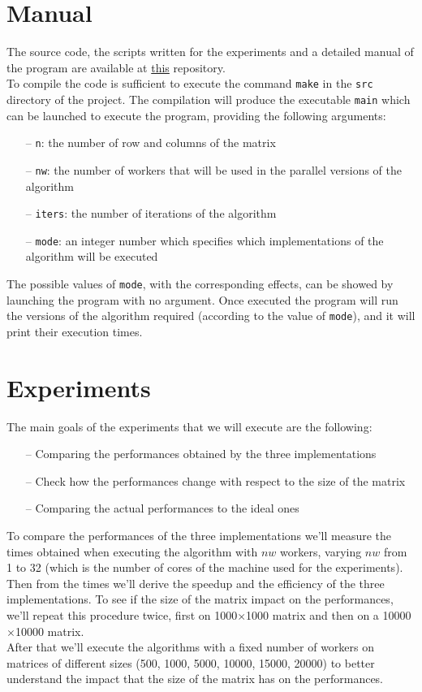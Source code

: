 \documentclass[12pt]{article}
\begin{document}
	\section{Manual}
	The source code, the scripts written for the experiments and a detailed manual of the program are available at \href{https://github.com/DiegoArcelli/Parallel-And-Distributed-Systems-Project}{this} repository.\\ 
	To compile the code is sufficient to execute the command \verb*|make| in the \verb*|src| directory of the project. The compilation will produce the executable \verb*|main| which can be launched to execute the program, providing the following arguments:
	\begin{itemize}
		\item[--] \verb|n|: the number of row and columns of the matrix
		\item[--] \verb|nw|: the number of workers that will be used in the parallel versions of the algorithm
		\item[--] \verb|iters|: the number of iterations of the algorithm
		\item[--] \verb|mode|: an integer number which specifies which implementations of the algorithm will be executed
	\end{itemize} 
	The possible values of \verb|mode|, with the corresponding effects, can be showed by launching the program with no argument. Once executed the program will run the versions of the algorithm required (according to the value of \verb|mode|), and it will print their execution times. 
	
	\section{Experiments}
	The main goals of the experiments that we will execute are the following: 
	\begin{itemize}
		\item[--] Comparing the performances obtained by the three implementations 
		\item[--] Check how the performances change with respect to the size of the matrix
		\item[--] Comparing the actual performances to the ideal ones
	\end{itemize}
	To compare the performances of the three implementations we'll measure the times obtained when executing the algorithm with $nw$ workers, varying $nw$ from 1 to 32 (which is the number of cores of the machine used for the experiments). Then from the times we'll derive the speedup and the efficiency of the three implementations. To see if the size of the matrix impact on the performances, we'll repeat this procedure twice, first on 1000$\times$1000 matrix and then on a 10000$\times$10000 matrix.\\
	After that we'll execute the algorithms with a fixed number of workers on matrices of different sizes (500, 1000, 5000, 10000, 15000, 20000) to better understand the impact that the size of the matrix has on the performances.\\ 
	
\end{document}
